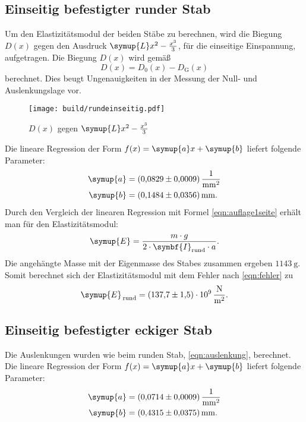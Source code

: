 \subsection{Einseitig befestigter runder Stab}
Um den Elastizitätsmodul der beiden Stäbe zu berechnen, wird die Biegung
$D(x)$ gegen den Ausdruck $\symup{L}x^2 - \frac{x^3}{3}$, für die
einseitige Einspannung, aufgetragen.
Die Biegung $D(x)$ wird gemäß
\begin{equation}
  D (x) = D_0 (x) - D_{\text{G}} (x)
  \label{eqn:auslenkung}
\end{equation}
berechnet. Dies beugt Ungenauigkeiten in der Messung der Null- und
Auslenkungslage vor.

\begin{figure}
  \centering
  \texttt{[image: build/rundeinseitig.pdf]}
  \caption{$D(x)$ gegen $\symup{L}x^2 - \frac{x^3}{3}$}
  \label{fig:plot1}
\end{figure}

Die lineare Regression der Form $f(x) = \symup{a}x + \symup{b}$
liefert folgende Parameter:
\begin{align*}
  \symup{a} &= \SI{0.0829(0009)}{\per\milli\meter\squared}\\
  \symup{b} &= \SI{0.1484(0356)}{\milli\meter}.
\end{align*}
Durch den Vergleich der linearen Regression mit Formel
\eqref{eqn:auflage1seite} erhält man für den Elastizitätsmodul:
\begin{equation}
  \symup{E} = \frac{m \cdot g}{2 \cdot \symbf{I}_{\text{rund}} \cdot a}.
  \label{eqn:emodulrund}
\end{equation}
Die angehängte Masse mit der Eigenmasse des Stabes zusammen ergeben
$\SI{1143}{\gram}$.
Somit berechnet sich der Elastizitätsmodul
mit dem Fehler nach \eqref{eqn:fehler} zu
\begin{equation*}
  \symup{E}_{\, \text{rund}} = \SI{137.7 \pm 1.5 e+9}{\newton\per\meter\squared}.
\end{equation*}

\subsection{Einseitig befestigter eckiger Stab}
Die Auslenkungen wurden wie beim runden Stab, \eqref{eqn:auslenkung}, berechnet.
Die lineare Regression der Form $f(x) = \symup{a}x + \symup{b}$
liefert folgende Parameter:
\begin{align*}
  \symup{a} &= \SI{0.0714(0009)}{\per\milli\meter\squared}\\
  \symup{b} &= \SI{0.4315(0375)}{\milli\meter}.
\end{align*}


